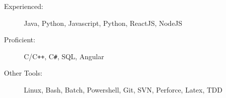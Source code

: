 

\begin{description}
\item[Experienced:]
Java, Python, Javascript, Python, ReactJS, NodeJS
\item[Proficient:]
C/C{}\verb!++!, C{}\verb!#!, SQL, Angular
\item[Other Tools:]
Linux, Bash, Batch, Powershell, Git, SVN, Perforce, Latex, TDD
\end{description}
